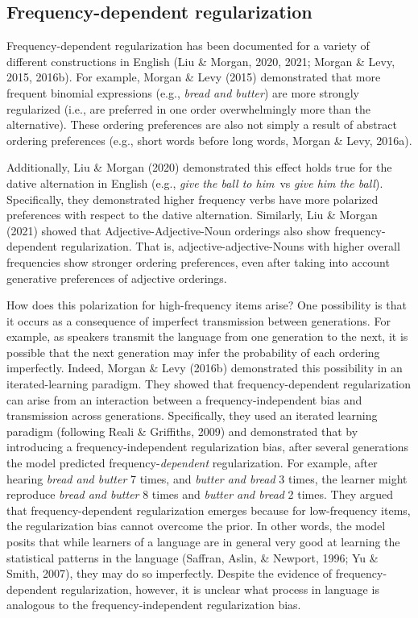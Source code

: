 \documentclass[10pt, letterpaper]{article}
\begin{document}
\hypertarget{frequency-dependent-regularization}{%
\subsection{Frequency-dependent
regularization}\label{frequency-dependent-regularization}}

Frequency-dependent regularization has been documented for a variety of
different constructions in English (Liu \& Morgan, 2020, 2021; Morgan \&
Levy, 2015, 2016b). For example, Morgan \& Levy (2015) demonstrated that
more frequent binomial expressions (e.g., \emph{bread and butter}) are
more strongly regularized (i.e., are preferred in one order
overwhelmingly more than the alternative). These ordering preferences
are also not simply a result of abstract ordering preferences (e.g.,
short words before long words, Morgan \& Levy, 2016a).

Additionally, Liu \& Morgan (2020) demonstrated this effect holds true
for the dative alternation in English (e.g., \emph{give} \emph{the ball
to him}~vs \emph{give him the ball}). Specifically, they demonstrated
higher frequency verbs have more polarized preferences with respect to
the dative alternation. Similarly, Liu \& Morgan (2021) showed that
Adjective-Adjective-Noun orderings also show frequency-dependent
regularization. That is, adjective-adjective-Nouns with higher overall
frequencies show stronger ordering preferences, even after taking into
account generative preferences of adjective orderings.

How does this polarization for high-frequency items arise? One
possibility is that it occurs as a consequence of imperfect transmission
between generations. For example, as speakers transmit the language from
one generation to the next, it is possible that the next generation may
infer the probability of each ordering imperfectly. Indeed, Morgan \&
Levy (2016b) demonstrated this possibility in an iterated-learning
paradigm. They showed that frequency-dependent regularization can arise
from an interaction between a frequency-independent bias and
transmission across generations. Specifically, they used an iterated
learning paradigm (following Reali \& Griffiths, 2009) and demonstrated
that by introducing a frequency-independent regularization bias, after
several generations the model predicted frequency-\emph{dependent}
regularization. For example, after hearing \emph{bread and butter} 7
times, and \emph{butter and bread} 3 times, the learner might reproduce
\emph{bread and butter} 8 times and \emph{butter and bread} 2 times.
They argued that frequency-dependent regularization emerges because for
low-frequency items, the regularization bias cannot overcome the prior.
In other words, the model posits that while learners of a language are
in general very good at learning the statistical patterns in the
language (Saffran, Aslin, \& Newport, 1996; Yu \& Smith, 2007), they may
do so imperfectly. Despite the evidence of frequency-dependent
regularization, however, it is unclear what process in language is
analogous to the frequency-independent regularization bias.
\end{document}
